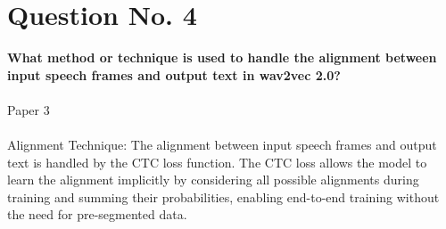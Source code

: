 \documentclass{article}
\begin{document}
\pagebreak

\section*{Question No. 4}
\textbf{What method or technique is used to handle the alignment between input speech frames and output text in wav2vec 2.0?}\\\\
Paper 3\\\\
Alignment Technique: The alignment between input speech frames and output text is handled by the CTC loss function. The CTC loss allows the model to learn the alignment implicitly by considering all possible alignments during training and summing their probabilities, enabling end-to-end training without the need for pre-segmented data.
\end{document}
